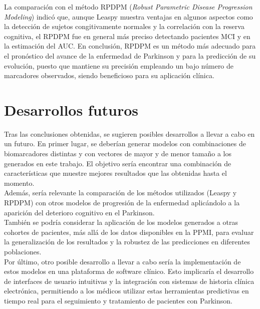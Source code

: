 La comparación con el método RPDPM (\textit{Robust Parametric Disease Progression Modeling}) indicó que, aunque Leaspy muestra ventajas en algunos aspectos como la detección de sujetos congitivamente normales y la correlación con la reserva cognitiva, el RPDPM fue en general más preciso detectando pacientes MCI y en la estimación del AUC. En conclusión, RPDPM es un método más adecuado para el pronóstico del avance de la enfermedad de Parkinson y para la predicción de su evolución, puesto que mantiene su precisión empleando un bajo número de marcadores observados, siendo beneficioso para su aplicación clínica.\\


\section{Desarrollos futuros}

Tras las conclusiones obtenidas, se sugieren posibles desarrollos a llevar a cabo en un futuro. En primer lugar, se deberían generar modelos con combinaciones de biomarcadores distintas y con vectores de mayor y de menor tamaño a los generados en este trabajo. El objetivo sería encontrar una combinación de características que muestre mejores resultados que las obtenidas hasta el momento. \\

Además, sería relevante la comparación de los métodos utilizados (Leaspy y RPDPM) con otros modelos de progresión de la enfermedad aplicándolo a la aparición del deterioro cognitivo en el Parkinson. \\

También se podría considerar la aplicación de los modelos generados a otras cohortes de pacientes, más allá de los datos disponibles en la PPMI, para evaluar la generalización de los resultados y la robustez de las predicciones en diferentes poblaciones.\\

Por último, otro posible desarrollo a llevar a cabo sería la implementación de estos modelos en una plataforma de software clínico. Esto implicaría el desarrollo de interfaces de usuario intuitivas y la integración con sistemas de historia clínica electrónica, permitiendo a los médicos utilizar estas herramientas predictivas en tiempo real para el seguimiento y tratamiento de pacientes con Parkinson.